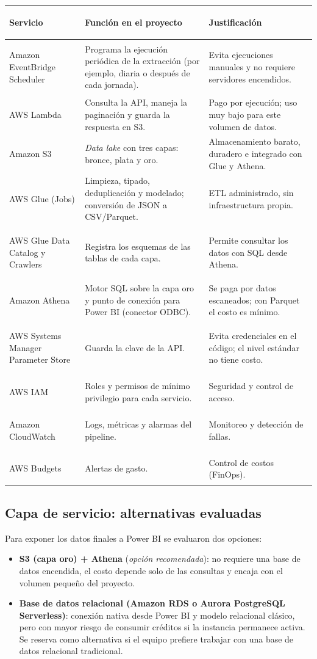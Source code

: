\documentclass[11pt,a4paper]{article}
\begin{document}
\begin{longtable}{>{\bfseries\raggedright}p{3.2cm} >{\raggedright}p{5.6cm} >{\raggedright\arraybackslash}p{5.4cm}}
\toprule
Servicio & Función en el proyecto & Justificación \\
\midrule
\endhead
Amazon EventBridge Scheduler & Programa la ejecución periódica de la extracción (por ejemplo, diaria o después de cada jornada). & Evita ejecuciones manuales y no requiere servidores encendidos. \\
AWS Lambda & Consulta la API, maneja la paginación y guarda la respuesta en S3. & Pago por ejecución; uso muy bajo para este volumen de datos. \\
Amazon S3 & \textit{Data lake} con tres capas: bronce, plata y oro. & Almacenamiento barato, duradero e integrado con Glue y Athena. \\
AWS Glue (Jobs) & Limpieza, tipado, deduplicación y modelado; conversión de JSON a CSV/Parquet. & ETL administrado, sin infraestructura propia. \\
AWS Glue Data Catalog y Crawlers & Registra los esquemas de las tablas de cada capa. & Permite consultar los datos con SQL desde Athena. \\
Amazon Athena & Motor SQL sobre la capa oro y punto de conexión para Power BI (conector ODBC). & Se paga por datos escaneados; con Parquet el costo es mínimo. \\
AWS Systems Manager Parameter Store & Guarda la clave de la API. & Evita credenciales en el código; el nivel estándar no tiene costo. \\
AWS IAM & Roles y permisos de mínimo privilegio para cada servicio. & Seguridad y control de acceso. \\
Amazon CloudWatch & Logs, métricas y alarmas del pipeline. & Monitoreo y detección de fallas. \\
AWS Budgets & Alertas de gasto. & Control de costos (FinOps). \\
\bottomrule
\end{longtable}

\subsection{Capa de servicio: alternativas evaluadas}
Para exponer los datos finales a Power BI se evaluaron dos opciones:

\begin{itemize}
  \item \textbf{S3 (capa oro) + Athena} (\textit{opción recomendada}): no requiere una base de datos encendida, el costo depende solo de las consultas y encaja con el volumen pequeño del proyecto.
  \item \textbf{Base de datos relacional (Amazon RDS o Aurora PostgreSQL Serverless)}: conexión nativa desde Power BI y modelo relacional clásico, pero con mayor riesgo de consumir créditos si la instancia permanece activa. Se reserva como alternativa si el equipo prefiere trabajar con una base de datos relacional tradicional.
\end{itemize}
\end{document}
